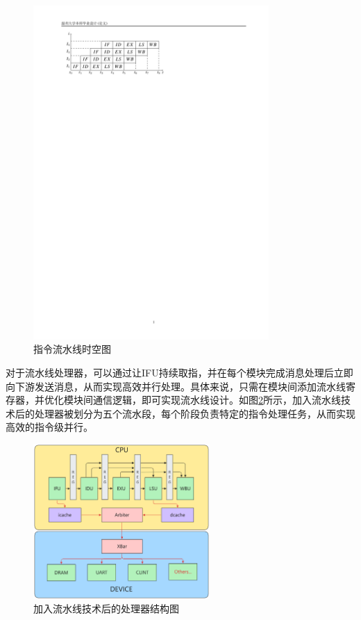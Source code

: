 \begin{figure}[htbp]
	\centering
	\includegraphics[width=0.8\textwidth]{image/pipeline_timeline.pdf}
	\caption{指令流水线时空图}
	\label{fig:pipeline_timeline}
\end{figure}

对于流水线处理器，可以通过让IFU持续取指，并在每个模块完成消息处理后立即向下游发送消息，从而实现高效并行处理。具体来说，只需在模块间添加流水线寄存器，并优化模块间通信逻辑，即可实现流水线设计。如图\ref{fig:assembly_line_cpu}所示，加入流水线技术后的处理器被划分为五个流水段，每个阶段负责特定的指令处理任务，从而实现高效的指令级并行。

\begin{figure}[htbp]
	\centering
	\includegraphics[width=0.6\textwidth]{image/assembly_line_cpu.pdf}
	\caption{加入流水线技术后的处理器结构图}
	\label{fig:assembly_line_cpu}
\end{figure}

